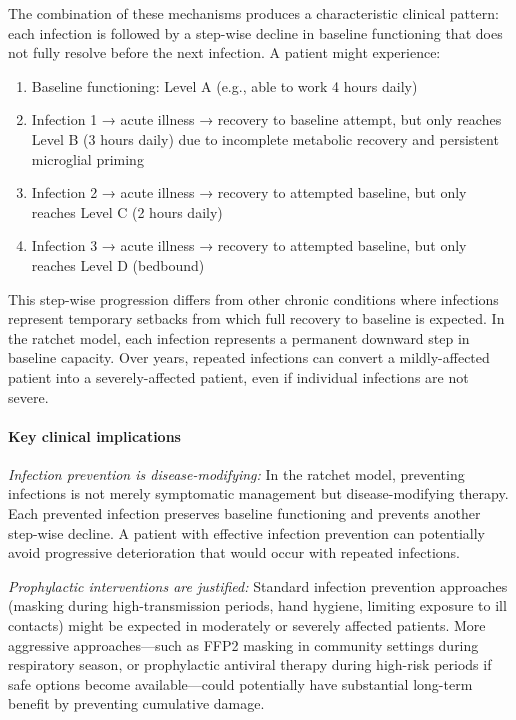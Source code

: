 \begin{speculation}
The combination of these mechanisms produces a characteristic clinical pattern: each infection is followed by a step-wise decline in baseline functioning that does not fully resolve before the next infection. A patient might experience:

\begin{enumerate}
    \item Baseline functioning: Level A (e.g., able to work 4 hours daily)
    \item Infection 1 → acute illness → recovery to baseline attempt, but only reaches Level B (3 hours daily) due to incomplete metabolic recovery and persistent microglial priming
    \item Infection 2 → acute illness → recovery to attempted baseline, but only reaches Level C (2 hours daily)
    \item Infection 3 → acute illness → recovery to attempted baseline, but only reaches Level D (bedbound)
\end{enumerate}

This step-wise progression differs from other chronic conditions where infections represent temporary setbacks from which full recovery to baseline is expected. In the ratchet model, each infection represents a permanent downward step in baseline capacity. Over years, repeated infections can convert a mildly-affected patient into a severely-affected patient, even if individual infections are not severe.

\paragraph{Key clinical implications}

\textit{Infection prevention is disease-modifying:} In the ratchet model, preventing infections is not merely symptomatic management but disease-modifying therapy. Each prevented infection preserves baseline functioning and prevents another step-wise decline. A patient with effective infection prevention can potentially avoid progressive deterioration that would occur with repeated infections.

\textit{Prophylactic interventions are justified:} Standard infection prevention approaches (masking during high-transmission periods, hand hygiene, limiting exposure to ill contacts) might be expected in moderately or severely affected patients. More aggressive approaches---such as FFP2 masking in community settings during respiratory season, or prophylactic antiviral therapy during high-risk periods if safe options become available---could potentially have substantial long-term benefit by preventing cumulative damage.


\end{speculation}
